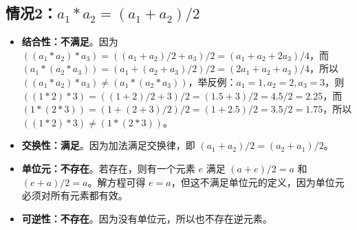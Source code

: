 \documentclass[utf8]{ctexart}
\theoremstyle{mystyle}
\begin{document}
\subsection*{情况2：$a_1 * a_2 = (a_1 + a_2) / 2$}
\begin{itemize}
  \item \textbf{结合性：不满足}。因为 $((a_1 * a_2) * a_3) = ((a_1 + a_2) / 2 + a_3) / 2 = (a_1 + a_2 + 2a_3) / 4$，而 $(a_1 * (a_2 * a_3)) = (a_1 + (a_2 + a_3) / 2) / 2 = (2a_1 + a_2 + a_3) / 4$，所以 $((a_1 * a_2) * a_3) \neq (a_1 * (a_2 * a_3))$，举反例：$a_1 = 1, a_2 = 2, a_3 = 3$，则 $((1 * 2) * 3) = ((1 + 2) / 2 + 3) / 2 = (1.5 + 3) / 2 = 4.5 / 2 = 2.25$，而 $(1 * (2 * 3)) = (1 + (2 + 3) / 2) / 2 = (1 + 2.5) / 2 = 3.5 / 2 = 1.75$，所以 $((1 * 2) * 3) \neq (1 * (2 * 3))$。
  
  \item \textbf{交换性：满足}。因为加法满足交换律，即 $ (a_1 + a_2) / 2 = (a_2 + a_1) / 2 $。
  
  \item \textbf{单位元：不存在}。若存在，则有一个元素 $e$ 满足 $(a + e) / 2 = a$ 和 $(e + a) / 2 = a$。解方程可得 $e = a$，但这不满足单位元的定义，因为单位元必须对所有元素都有效。
  
  \item \textbf{可逆性：不存在}。因为没有单位元，所以也不存在逆元素。
\end{itemize}
\end{document}
